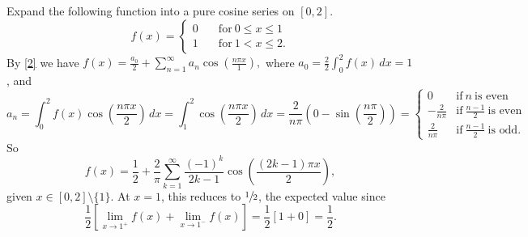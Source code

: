 \begin{example}
    Expand the following function into a pure cosine series on $[0,2]$. \[
        f(x)=
        \begin{cases}
            0\quad &\text{for} \ 0\leq x\leq 1\\
            1 & \text{for} \ 1<x\leq 2.
        \end{cases}
    \] By \cref{2} we have $f(x)=\frac{a_0}{2}+\sum_{n=1}^{\infty} a_n  \cos \left( \frac{n\pi x}{1} \right) ,$ where $a_0=\frac{2}{2}\int_{0}^{2} f(x) \, dx=1$, and \[
    a_n =\int_{0}^{2} f(x) \cos \left( \frac{n\pi x}{2} \right)  \, dx=\int_{1}^{2} \cos \left( \frac{n\pi x}{2} \right)  \, dx=\frac{2}{n\pi}\left( 0-\sin \left( \frac{n\pi}{2} \right)  \right) =
    \begin{cases}
        0\quad & \text{if} \ n \ \text{is even} \\
        -\frac{2}{n\pi}& \text{if} \ \frac{n-1}{2} \ \text{is even} \\
        \frac{2}{n\pi}& \text{if} \ \frac{n-1}{2}\ \text{is odd.}  
    \end{cases}
    \] So \[
    f(x)=\frac{1}{2}+\frac{2}{\pi}\sum_{k=1}^{\infty} \frac{(-1)^k}{2k-1}\cos \left( \frac{(2k-1)\pi x}{2} \right) ,
\] given $x\in [0,2]\setminus \{1\} $. At $x=1$, this reduces to $\sfrac{1}{2}$, the expected value since \[
\frac{1}{2}\left[ \lim_{x\to 1^+}f(x) + \lim_{x\to 1^-}f(x) \right] =\frac{1}{2}[1+0]=\frac{1}{2}.
\] 
\end{example}

